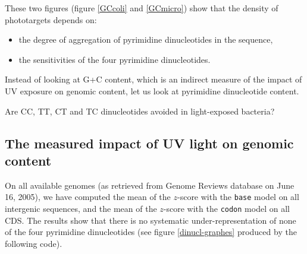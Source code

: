 \documentclass{article}
\begin{document}
\begin{figure}
\centering{}
\end{figure}

These two figures (figure \ref{GCcoli} and \ref{GCmicro}) show 
that the density of phototargets depends on:

\begin{itemize}
\item the degree of aggregation of pyrimidine dinucleotides in the
sequence,
\item the sensitivities of the four pyrimidine dinucleotides.
  \end{itemize}

Instead of looking at G+C content, which is an indirect measure of the
impact of UV exposure on genomic content, let us look at pyrimidine
dinucleotide content.

Are CC, TT, CT and TC dinucleotides avoided in light-exposed bacteria?

\subsection{The measured impact of UV light on genomic content}

On all available genomes (as retrieved from Genome Reviews database on
June 16, 2005), we have computed the mean of the $z$-score with
the \texttt{base} model on all intergenic sequences, and the mean of
the $z$-score with the \texttt{codon} model on all CDS.
The results show that there is no systematic under-representation of
none of the four pyrimidine dinucleotides (see figure
\ref{dinucl-graphes} produced by the following code).
\end{document}
